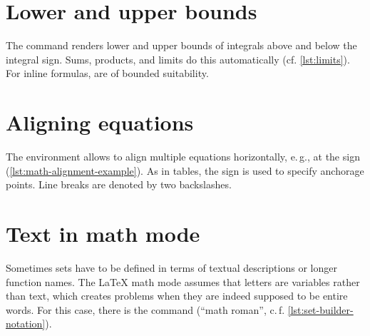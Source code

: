 \section{Lower and upper bounds}

The  command renders lower and upper bounds of integrals above and below the integral sign.
Sums, products, and limits do this 
automatically (cf. \cref{lst:limits}).
For inline formulas,  are of bounded suitability.


\section{Aligning equations}

The  environment allows to align multiple equations horizontally, e.\,g., at the \mono{=} sign (\cref{lst:math-alignment-example}).
As in tables, the \mono{\&} sign is used to specify anchorage points.
Line breaks are denoted by two backslashes.


\section{Text in math mode}

Sometimes sets have to be defined in terms of textual descriptions or longer function names.
The \LaTeX{} math mode assumes that letters are variables rather than text, which creates problems when they are indeed supposed to be entire words.
For this case, there is the  command (\enquote{math roman}, c.\,f. \cref{lst:set-builder-notation}).

